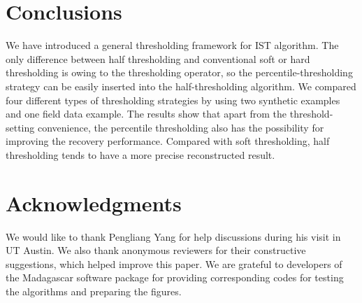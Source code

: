 \section{Conclusions}
We have introduced a general thresholding framework for IST algorithm. The only difference between half thresholding and conventional soft or hard thresholding is owing to the thresholding operator, so the percentile-thresholding strategy can be easily inserted into the half-thresholding algorithm. We compared four different types of thresholding strategies by using two synthetic examples and one field data example. The results show that apart from the threshold-setting convenience, the percentile thresholding also has the possibility for improving the recovery performance. Compared with soft thresholding, half thresholding tends to have a more precise reconstructed result.

\section{Acknowledgments}
We would like to thank Pengliang Yang for help discussions during his visit in UT Austin. We also thank   anonymous reviewers for their constructive suggestions, which helped improve this paper. We are grateful to developers of the Madagascar software package for providing corresponding codes for testing the algorithms and preparing the figures. 

